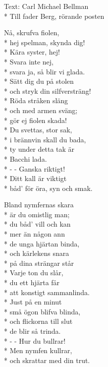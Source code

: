 \begin{SongText}
\begin{SongInfo}
    Text: Carl Michael Bellman\\*%
    Till fader Berg, rörande posten
\end{SongInfo}
\begin{SongVerse}
Nå, skrufva fiolen,\\*%
hej spelman, skynda dig!\\*%
Kära syster, hej!\\*%
Svara inte nej,\\*%
svara ja, så blir vi glada.\\*%
Sätt dig du på stolen\\*%
och stryk din silfversträng!\\*%
Röda stråken släng\\*%
och med armen sväng;\\*%
gör ej fiolen skada!\\*%
Du svettas, stor sak,\\*%
i brännvin skall du bada,\\*%
ty under detta tak är\\*%
Bacchi lada.\\*%
- - Ganska riktigt!\\*%
Ditt kall är viktigt\\*%
båd’ för öra, syn och smak.
\end{SongVerse}
\begin{SongVerse}
Bland nymfernas skara\\*%
är du omistlig man;\\*%
du båd’ vill och kan\\*%
mer än någon ann\\*%
de unga hjärtan binda,\\*%
och kärlekens snara\\*%
på dina strängar står\\*%
Varje ton du slår,\\*%
du ett hjärta får\\*%
att konstigt sammanlinda.\\*%
Just på en minut\\*%
små ögon blifva blinda,\\*%
och flickorna till slut\\*%
de blir så trinda.\\*%
- - Hur du bullrar!\\*%
Men nymfen kullrar,\\*%
och skrattar med din trut. 

\end{SongVerse}
\end{SongText}
